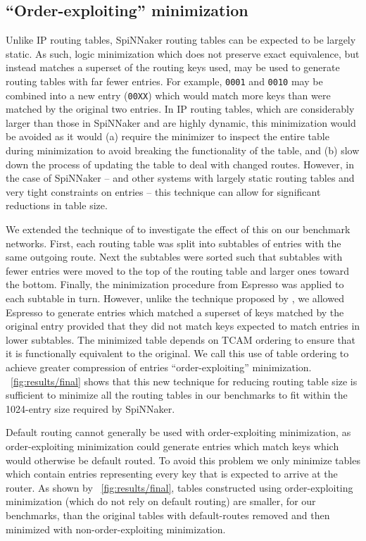 \documentclass[conference]{IEEEtran}
\newcommand{\mytt}[1]{\texttt{\footnotesize#1}}
\begin{document}
\subsection*{``Order-exploiting'' minimization}

Unlike IP routing tables, SpiNNaker routing tables can be expected to be largely static.
As such, logic minimization which does not preserve exact equivalence, but instead matches a superset of the routing keys used, may be used to generate routing tables with far fewer entries.
For example, \mytt{0001} and \mytt{0010} may be combined into a new entry (\mytt{00XX}) which would match more keys than were matched by the original two entries.
In IP routing tables, which are considerably larger than those in SpiNNaker and are highly dynamic, this minimization would be avoided as it would (a) require the minimizer to inspect the entire table during minimization to avoid breaking the functionality of the table,
and (b) slow down the process of updating the table to deal with changed routes.
However, in the case of SpiNNaker -- and other systems with largely static routing tables and very tight constraints on entries -- this technique can allow for significant reductions in table size.

We extended the technique of \textcite{Liu2002} to investigate the effect of this on our benchmark networks.
First, each routing table was split into subtables of entries with the same outgoing route.
Next the subtables were sorted such that subtables with fewer entries were moved to the top of the routing table and larger ones toward the bottom.
Finally, the minimization procedure from Espresso was applied to each subtable in turn.
However, unlike the technique proposed by \textcite{Liu2002}, we allowed Espresso to generate entries which matched a superset of keys matched by the original entry provided that they did not match keys expected to match entries in lower subtables.
The minimized table depends on TCAM ordering to ensure that it is functionally equivalent to the original.
We call this use of table ordering to achieve greater compression of entries ``order-exploiting'' minimization.
\figurename~\ref{fig:results/final} shows that this new technique for reducing routing table size is sufficient to minimize all the routing tables in our benchmarks to fit within the 1024-entry size required by SpiNNaker.

Default routing cannot generally be used with order-exploiting minimization, as order-exploiting minimization could generate entries which match keys which would otherwise be default routed.
To avoid this problem we only minimize tables which contain entries representing every key that is expected to arrive at the router.
As shown by \figurename~\ref{fig:results/final}, tables constructed using order-exploiting minimization (which do not rely on default routing) are smaller, for our benchmarks, than the original tables with default-routes removed and then minimized with non-order-exploiting minimization.
\end{document}
